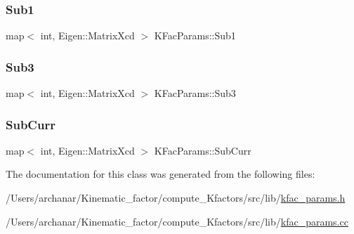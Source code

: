 \subsubsection{\texorpdfstring{Sub1}{Sub1}}
{\footnotesize\ttfamily map$<$ int, Eigen\+::\+Matrix\+Xcd $>$ K\+Fac\+Params\+::\+Sub1}

\mbox{\label{classKFacParams_a6b8bc2a8b93ba4340e17d9c03e4a86e7}} 
\subsubsection{\texorpdfstring{Sub3}{Sub3}}
{\footnotesize\ttfamily map$<$ int, Eigen\+::\+Matrix\+Xcd $>$ K\+Fac\+Params\+::\+Sub3}

\mbox{\label{classKFacParams_a29e84cd39c74d0535bc19cea03f4b6b1}} 
\subsubsection{\texorpdfstring{SubCurr}{SubCurr}}
{\footnotesize\ttfamily map$<$ int, Eigen\+::\+Matrix\+Xcd $>$ K\+Fac\+Params\+::\+Sub\+Curr}



The documentation for this class was generated from the following files\+:\begin{DoxyCompactItemize}
\item 
/\+Users/archanar/\+Kinematic\+\_\+factor/compute\+\_\+\+Kfactors/src/lib/\mbox{\hyperlink{kfac__params_8h}{kfac\+\_\+params.\+h}}\item 
/\+Users/archanar/\+Kinematic\+\_\+factor/compute\+\_\+\+Kfactors/src/lib/\mbox{\hyperlink{kfac__params_8cc}{kfac\+\_\+params.\+cc}}\end{DoxyCompactItemize}
